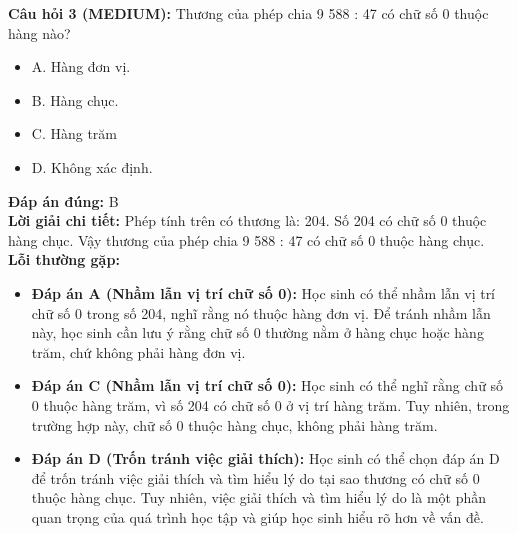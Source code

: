 \documentclass{article}
\begin{document}
\begin{minipage}{\textwidth}
\noindent\textbf{Câu hỏi 3 (MEDIUM):} Thương của phép chia 9 588 : 47 có chữ số 0 thuộc hàng nào? 
\begin{itemize}[label={}]
    \item A. Hàng đơn vị.
    \item B. Hàng chục.
    \item C. Hàng trăm
    \item D. Không xác định.
\end{itemize}
\textbf{Đáp án đúng:} B \\
\textbf{Lời giải chi tiết:} Phép tính trên có thương là: 204. Số 204 có chữ số 0 thuộc hàng chục. Vậy thương của phép chia 9 588 : 47 có chữ số 0 thuộc hàng chục. \\
\textbf{Lỗi thường gặp:}
\begin{itemize}
  \item \textbf{Đáp án A (Nhầm lẫn vị trí chữ số 0):} Học sinh có thể nhầm lẫn vị trí chữ số 0 trong số 204, nghĩ rằng nó thuộc hàng đơn vị. Để tránh nhầm lẫn này, học sinh cần lưu ý rằng chữ số 0 thường nằm ở hàng chục hoặc hàng trăm, chứ không phải hàng đơn vị.
  \item \textbf{Đáp án C (Nhầm lẫn vị trí chữ số 0):} Học sinh có thể nghĩ rằng chữ số 0 thuộc hàng trăm, vì số 204 có chữ số 0 ở vị trí hàng trăm. Tuy nhiên, trong trường hợp này, chữ số 0 thuộc hàng chục, không phải hàng trăm.
  \item \textbf{Đáp án D (Trốn tránh việc giải thích):} Học sinh có thể chọn đáp án D để trốn tránh việc giải thích và tìm hiểu lý do tại sao thương có chữ số 0 thuộc hàng chục. Tuy nhiên, việc giải thích và tìm hiểu lý do là một phần quan trọng của quá trình học tập và giúp học sinh hiểu rõ hơn về vấn đề.
\end{itemize}
\end{minipage}
\vspace{1em}
\end{document}
